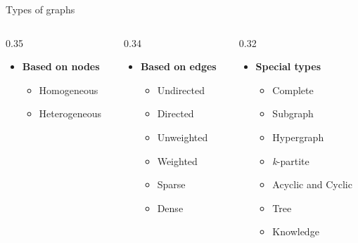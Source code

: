 \documentclass[aspectratio=169]{beamer}
\renewcommand{\alert}[1]{\textbf{\color{swufe}#1}}
\begin{document}
    \begin{frame}{Types of graphs}
        \begin{columns}[t] %
            \begin{column}{0.35\textwidth}
                \begin{itemize}
                    \item \alert{Based on nodes}
                    \begin{itemize}
                        \item Homogeneous
                        \item Heterogeneous
                    \end{itemize}
                \end{itemize}
            \end{column}
            
            \begin{column}{0.34\textwidth}
                \begin{itemize}
                    \item \alert{Based on edges}
                    \begin{itemize}
                        \item Undirected
                        \item Directed
                        \item Unweighted
                        \item Weighted
                        \item Sparse
                        \item Dense
                    \end{itemize}
                \end{itemize}
            \end{column}

            \begin{column}{0.32\textwidth}
                \begin{itemize}
                    \item \alert{Special types}
                    \begin{itemize}
                        \item Complete
                        \item Subgraph
                        \item Hypergraph
                        \item \textit{k}-partite
                        \item Acyclic and Cyclic
                        \item Tree
                        \item Knowledge            
                    \end{itemize}
                \end{itemize}
            \end{column}
        \end{columns}


\end{frame}
\end{document}
